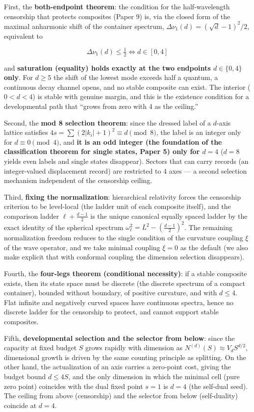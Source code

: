 \documentclass[
]{ltjsarticle}
\begin{document}
First, the \textbf{both-endpoint theorem}: the condition for the
half-wavelength censorship that protects composites (Paper 9) is, via
the closed form of the maximal anharmonic shift of the container
spectrum, \(\Delta\nu_1(d)=(\sqrt d-1)^2/2\), equivalent to

\[
\Delta\nu_1(d)\le\tfrac12\iff d\in[0,4]
\]

and \textbf{saturation (equality) holds exactly at the two endpoints
\(d\in\{0,4\}\) only}. For \(d\ge5\) the shift of the lowest mode
exceeds half a quantum, a continuous decay channel opens, and no stable
composite can exist. The interior (\(0<d<4\)) is stable with genuine
margin, and this is the existence condition for a developmental path
that ``grows from zero with 4 as the ceiling.''

Second, the \textbf{mod 8 selection theorem}: since the dressed label of
a \(d\)-axis lattice satisfies \(4s=\sum(2|k_i|+1)^2\equiv d\pmod 8\),
the label is an integer only for \(d\equiv0\pmod4\), and \textbf{it is
an odd integer (the foundation of the classification theorem for single
states, Paper 5) only for \(d=4\)} (\(d=8\) yields even labels and
single states disappear). Sectors that can carry records (an
integer-valued displacement record) are restricted to 4 axes --- a
second selection mechanism independent of the censorship ceiling.

Third, \textbf{fixing the normalization}: hierarchical relativity forces
the censorship criterion to be level-local (the ladder unit of each
composite itself), and the comparison ladder \(\ell+\tfrac{d-1}2\) is
the unique canonical equally spaced ladder by the exact identity of the
spherical spectrum \(\omega_\ell^2=L^2-(\tfrac{d-1}2)^2\). The remaining
normalization freedom reduces to the single condition of the curvature
coupling \(\xi\) of the wave operator, and we take minimal coupling
\(\xi=0\) as the default (we also make explicit that with conformal
coupling the dimension selection disappears).

Fourth, the \textbf{four-legs theorem (conditional necessity)}: if a
stable composite exists, then its state space must be discrete (the
discrete spectrum of a compact container), bounded without boundary, of
positive curvature, and with \(d\le4\). Flat infinite and negatively
curved spaces have continuous spectra, hence no discrete ladder for the
censorship to protect, and cannot support stable composites.

Fifth, \textbf{developmental selection and the selector from below}:
since the capacity at fixed budget \(S\) grows rapidly with dimension as
\(N^{(d)}(S)\approx V_d S^{d/2}\), dimensional growth is driven by the
same counting principle as splitting. On the other hand, the
actualization of an axis carries a zero-point cost, giving the budget
bound \(d\le4S\), and the only dimension in which the minimal cell (pure
zero point) coincides with the dual fixed point \(s=1\) is \(d=4\) (the
self-dual seed). The ceiling from above (censorship) and the selector
from below (self-duality) coincide at \(d=4\).
\end{document}
